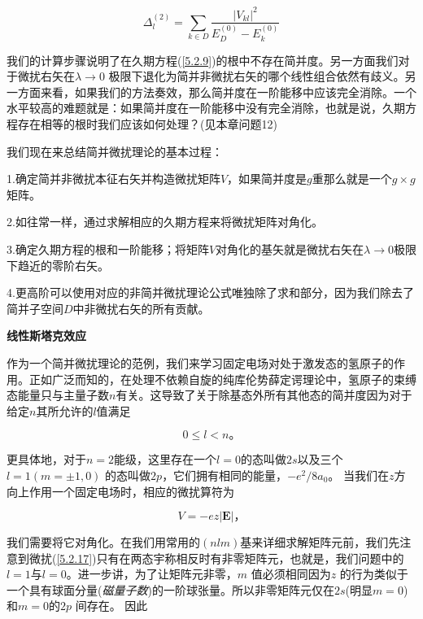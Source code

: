 ﻿\documentclass[UTF8,twoside]{ctexart}
\begin{document}
\begin{equation} \label{5.2.15}
\Delta_l^{(2)}=\displaystyle\sum_{k\in D}\dfrac{|V_{kl}|^2}{E_D^{(0)}-E_k^{(0)}}
\end{equation}

我们的计算步骤说明了在久期方程(\ref{5.2.9})的根中不存在简并度。另一方面我们对于微扰右矢在$\lambda\rightarrow0$ 极限下退化为简并非微扰右矢的哪个线性组合依然有歧义。另一方面来看，如果我们的方法奏效，那么简并度在一阶能移中应该完全消除。一个水平较高的难题就是：如果简并度在一阶能移中没有完全消除，也就是说，久期方程存在相等的根时我们应该如何处理？(见本章问题12)

我们现在来总结简并微扰理论的基本过程：

1.确定简并非微扰本征右矢并构造微扰矩阵$V$，如果简并度是$g$重那么就是一个$g\times g$矩阵。

2.如往常一样，通过求解相应的久期方程来将微扰矩阵对角化。

3.确定久期方程的根和一阶能移；将矩阵$V$对角化的基矢就是微扰右矢在$\lambda\rightarrow0$极限下趋近的零阶右矢。

4.更高阶可以使用对应的非简并微扰理论公式唯独除了求和部分，因为我们除去了简并子空间$D$中非微扰右矢的所有贡献。

\noindent \textbf{线性斯塔克效应}

\noindent 作为一个简并微扰理论的范例，我们来学习固定电场对处于激发态的氢原子的作用。正如广泛而知的，在处理不依赖自旋的纯库伦势薛定谔理论中，氢原子的束缚态能量只与主量子数$n$有关。这导致了关于除基态外所有其他态的简并度因为对于给定$n$其所允许的$l$值满足

\begin{equation} \label{5.2.16}
0\leq l<n\text{。}
\end{equation}

\noindent 更具体地，对于$n=2$能级，这里存在一个$l=0$的态叫做$2s$以及三个$l=1(m=\pm1,0)$ 的态叫做$2p$，它们拥有相同的能量，$-e^2/8a_0$。 当我们在$z$方向上作用一个固定电场时，相应的微扰算符为

\begin{equation} \label{5.2.17}
V=-ez|{\boldsymbol{E}}|\text{，}
\end{equation}

\noindent 我们需要将它对角化。在我们用常用的$(nlm)$基来详细求解矩阵元前，我们先注意到微扰(\ref{5.2.17})只有在两态宇称相反时有非零矩阵元，也就是，我们问题中的$l=1$与$l=0$。进一步讲，为了让矩阵元非零，$m$ 值必须相同因为$z$ 的行为类似于一个具有球面分量(\emph{磁量子数})的一阶球张量。所以非零矩阵元仅在$2s$(明显$m=0$)和$m=0$的$2p$ 间存在。 因此
\end{document}
